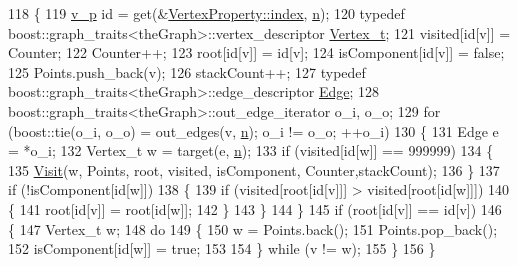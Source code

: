 \begin{DoxyCode}
118 \{
119     \hyperlink{utilities_8h_a3f4959b3d837fa6351a9414c79280286}{v\_p} \textcolor{keywordtype}{id} = \textcolor{keyword}{get}(&\hyperlink{struct_utility_structs_1_1_vertex_property_a636cb729438e999aa3d9a17ac39d8641}{VertexProperty::index}, \hyperlink{class_nuutila_a1409929fa0f38709497f8bdb012af71c}{n});
120     \textcolor{keyword}{typedef} boost::graph\_traits<theGraph>::vertex\_descriptor \hyperlink{class_graph_component_ae67114a6ce5a001dc35e1996e1b45aa0}{Vertex\_t};
121     visited[\textcolor{keywordtype}{id}[v]] = Counter;
122     Counter++;
123     root[\textcolor{keywordtype}{id}[v]] = \textcolor{keywordtype}{id}[v];
124     isComponent[\textcolor{keywordtype}{id}[v]] = \textcolor{keyword}{false};
125     Points.push\_back(v);
126     stackCount++;
127     \textcolor{keyword}{typedef} boost::graph\_traits<theGraph>::edge\_descriptor \hyperlink{class_graph_component_aa7517b2af08aa717324076a645c73fe6}{Edge};
128     boost::graph\_traits<theGraph>::out\_edge\_iterator o\_i, o\_o;
129     \textcolor{keywordflow}{for} (boost::tie(o\_i, o\_o) = out\_edges(v, \hyperlink{class_nuutila_a1409929fa0f38709497f8bdb012af71c}{n}); o\_i != o\_o; ++o\_i)
130     \{
131         Edge e = *o\_i;
132         Vertex\_t w = target(e, \hyperlink{class_nuutila_a1409929fa0f38709497f8bdb012af71c}{n});
133         \textcolor{keywordflow}{if} (visited[\textcolor{keywordtype}{id}[w]] == 999999)
134         \{
135             \hyperlink{class_nuutila_a2d43bc514d7375f9d63e60c06f90a60f}{Visit}(w, Points, root, visited, isComponent, Counter,stackCount);
136         \}
137         \textcolor{keywordflow}{if} (!isComponent[\textcolor{keywordtype}{id}[w]])
138         \{
139             \textcolor{keywordflow}{if} (visited[root[\textcolor{keywordtype}{id}[v]]] > visited[root[\textcolor{keywordtype}{id}[w]]])
140             \{
141                 root[\textcolor{keywordtype}{id}[v]] = root[\textcolor{keywordtype}{id}[w]];
142             \}
143         \}
144     \}
145     \textcolor{keywordflow}{if} (root[\textcolor{keywordtype}{id}[v]] == \textcolor{keywordtype}{id}[v])
146     \{
147         Vertex\_t w;
148         \textcolor{keywordflow}{do}
149         \{
150             w = Points.back();
151             Points.pop\_back();
152             isComponent[\textcolor{keywordtype}{id}[w]] = \textcolor{keyword}{true};
153 
154         \} \textcolor{keywordflow}{while} (v != w);
155     \}
156 \}
\end{DoxyCode}
\mbox{\label{class_nuutila_a83b47177cf452e80b3ceaf064ff59840}} 
